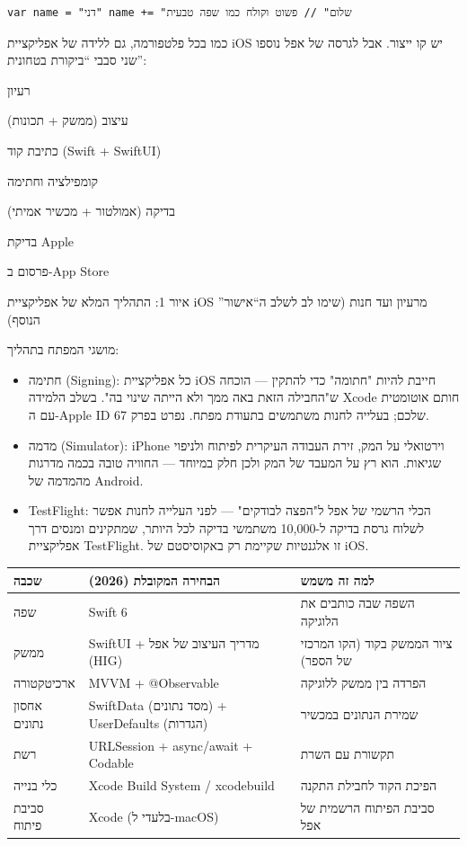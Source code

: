\begin{lstlisting}
var name = "דני" name += "שלום" // פשוט וקולח כמו שפה טבעית
\end{lstlisting}


כמו בכל פלטפורמה, גם ללידה של אפליקציית iOS יש קו ייצור. אבל לגרסה של אפל נוספו שני סבבי “ביקורת בטחונית”:

רעיון

עיצוב (ממשק + תכונות)

כתיבת קוד (Swift + SwiftUI)

קומפילציה וחתימה

בדיקה (אמולטור + מכשיר אמיתי)

בדיקת Apple

פרסום ב-App Store

\begin{center}\small\color{gray}איור 1: התהליך המלא של אפליקציית iOS מרעיון ועד חנות (שימו לב לשלב ה“אישור” הנוסף)\end{center}

מושגי המפתח בתהליך:

\begin{itemize}
  \item חתימה (Signing): כל אפליקציית iOS חייבת להיות "חתומה" כדי להתקין — הוכחה ש"החבילה הזאת באה ממך ולא הייתה שינוי בה". בשלב הלמידה Xcode חותם אוטומטית עם ה-Apple ID שלכם; בעלייה לחנות משתמשים בתעודת מפתח. נפרט בפרק 67.
  \item מדמה (Simulator): iPhone וירטואלי על המק, זירת העבודה העיקרית לפיתוח ולניפוי שגיאות. הוא רץ על המעבד של המק ולכן חלק במיוחד — החוויה טובה בכמה מדרגות מהמדמה של Android.
  \item TestFlight: הכלי הרשמי של אפל ל"הפצה לבודקים" — לפני העלייה לחנות אפשר לשלוח גרסת בדיקה ל-10,000 משתמשי בדיקה לכל היותר, שמתקינים ומנסים דרך אפליקציית TestFlight. זו אלגנטיות שקיימת רק באקוסיסטם של iOS.
\end{itemize}


\begin{center}
\begin{tabularx}{\linewidth}{|X|X|X|}
\hline
\textbf{שכבה} & \textbf{הבחירה המקובלת (2026)} & \textbf{למה זה משמש} \tabularnewline
\hline
שפה & Swift 6 & השפה שבה כותבים את הלוגיקה \tabularnewline
ממשק & SwiftUI + מדריך העיצוב של אפל (HIG) & ציור הממשק בקוד (הקו המרכזי של הספר) \tabularnewline
ארכיטקטורה & MVVM + @Observable & הפרדה בין ממשק ללוגיקה \tabularnewline
אחסון נתונים & SwiftData (מסד נתונים) + UserDefaults (הגדרות) & שמירת הנתונים במכשיר \tabularnewline
רשת & URLSession + async/await + Codable & תקשורת עם השרת \tabularnewline
כלי בנייה & Xcode Build System / xcodebuild & הפיכת הקוד לחבילת התקנה \tabularnewline
סביבת פיתוח & Xcode (בלעדי ל-macOS) & סביבת הפיתוח הרשמית של אפל \tabularnewline
\hline
\end{tabularx}
\end{center}

